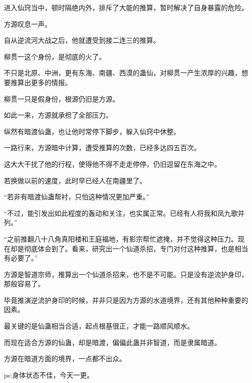 \begin{this_body}
进入仙窍当中，顿时隔绝内外，排斥了大能的推算，暂时解决了自身暴露的危险。

方源叹息一声。

自从逆流河大战之后，他就遭受到接二连三的推算。

柳贯一这个身份，是彻底的火了。

不只是北原、中洲，更有东海、南疆、西漠的蛊仙，对柳贯一产生浓厚的兴趣，想要推算出更多的情报。

柳贯一只是假身份，根源仍旧是方源。

如此一来，方源就承担了全部压力。

纵然有暗渡仙蛊，也让他时常停下脚步，躲入仙窍中休整。

一路行来，方源暗中计算，遭受推算的次数，已经多达四五百次。

这大大干扰了他的行程，使得他不得不走走停停，仍旧逗留在东海之中。

若换做以前的速度，此时早已经人在南疆里了。

“若非有暗渡仙蛊帮衬，只怕这种情况更加严重。”

“不过，能引发出如此程度的轰动和关注，也实属正常。已经有人将我和凤九歌并列。”

“之前推翻八十八角真阳楼和王庭福地，有影宗帮忙遮掩，并不觉得这种压力。现在却是彻底体会到了。看来，研究出一个仙道杀招，专门对付这种推算，也是相当有必要了。”

方源是智道宗师，推算出一个仙道杀招来，也不是不可能。只是没有逆流护身印，那般容易了。

毕竟推演逆流护身印的时候，并非只是因为方源的水道境界，还有其他种种重要的因素。

最关键的是仙蛊相当合适，起点根基很正，才能一路顺风顺水。

而现在适合方源的仙蛊，却是暗渡，偏偏此蛊并非智道，而是隶属暗道。

方源在暗道方面的境界，一点都不出众。

ps:身体状态不佳，今天一更。

\end{this_body}

